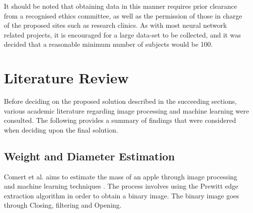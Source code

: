 \documentclass[conference]{IEEEtran}
\begin{document}
It should be noted that obtaining data in this manner requires prior clearance from a recognised ethics committee, as well as the permission of those in charge of the proposed sites such as research clinics.
As with most neural network related projects, it is encouraged for a large data-set to be collected, and it was decided that a reasonable minimum number of subjects would be 100.
\section{Literature Review}
Before deciding on the proposed solution described in the succeeding sections, various academic literature regarding image processing and machine learning were consulted.
The following provides a summary of findings that were considered when deciding upon the final solution.

\subsection{Weight and Diameter Estimation}
Comert et al. aims to estimate the mass of an apple through image processing and machine learning techniques \cite{comert}.
The process involves using the Prewitt edge extraction algorithm in order to obtain a binary image.
The binary image goes through Closing, filtering and Opening.
\end{document}
